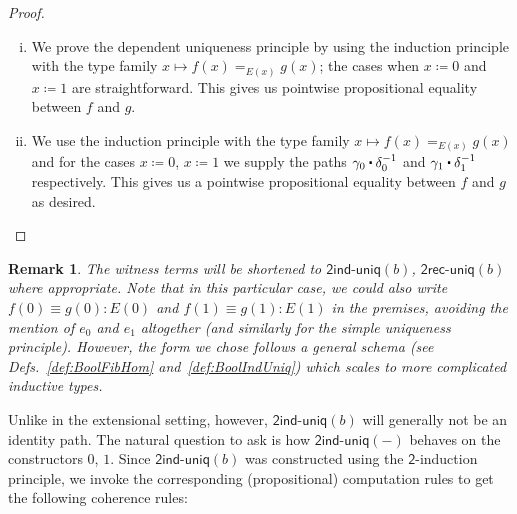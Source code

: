 \documentclass[reqno,10pt,a4paper,oneside]{amsart}
\newcommand{\defeq}{\coloneqq}
\newcommand{\Bool}{\mathsf{2}}
\newcommand{\boolinduniq}{\mathsf{2ind}\text{-}\mathsf{uniq}}
\newcommand{\boolrecuniq}{\mathsf{2rec}\text{-}\mathsf{uniq}}
\newcommand{\ct}{%
  \mathchoice{\mathbin{\raisebox{0.5ex}{$\displaystyle\centerdot$}}}%
             {\mathbin{\raisebox{0.5ex}{$\centerdot$}}}%
             {\mathbin{\raisebox{0.25ex}{$\scriptstyle\,\centerdot\,$}}}%
             {\mathbin{\raisebox{0.1ex}{$\scriptscriptstyle\,\centerdot\,$}}}}
\numberwithin{equation}{section}
\theoremstyle{mythm}
\theoremstyle{mydef}
\theoremstyle{myrmk}
\newtheorem{remark}[theorem]{Remark}
\begin{document}
\begin{proof} \hfill
\begin{enumerate}[(i)] 
\item We prove the dependent uniqueness principle by using the induction principle with the type family $x \mapsto f(x) =_{E(x)} g(x)$; the cases when $x \defeq 0$ and $x \defeq 1$ are straightforward. This gives us pointwise propositional equality between $f$ and $g$. 
\item We use the induction principle with the type family $x \mapsto f(x) =_{E(x)} g(x)$ and for the cases $x \defeq 0$, $x \defeq 1$ we supply the paths $\gamma_0 \ct \delta_0^{-1}$ and $\gamma_1 \ct \delta_1^{-1}$ respectively. This gives us a pointwise propositional equality between $f$ and $g$ as desired.
\end{enumerate}
\end{proof}

\begin{remark} The witness terms will be shortened to $\boolinduniq(b)$, $\boolrecuniq(b)$ where appropriate. Note that in this particular case, we could also write $f(0) \equiv g(0) : E(0)$ and $f(1) \equiv g(1) : E(1)$ in the premises, avoiding the mention of $e_0$ and $e_1$ altogether (and similarly for the simple uniqueness principle). However, the form we chose follows a general schema (see Defs.~\ref{def:BoolFibHom} and~\ref{def:BoolIndUniq}) which scales to more complicated inductive types. 
\end{remark}


Unlike in the extensional setting, however, $\boolinduniq(b)$ will generally not be an identity path. The natural question to ask is how $\boolinduniq(-)$ behaves on the constructors $0$, $1$. Since $\boolinduniq(b)$ was constructed using the $\Bool$-induction principle, we invoke the corresponding (propositional) computation rules to get the following coherence rules:\smallskip
\end{document}
